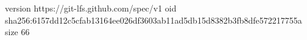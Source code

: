 version https://git-lfs.github.com/spec/v1
oid sha256:6157dd12c5cfab13164ee026df3603ab11ad5db15d8382b3fb8dfe572217755a
size 66
